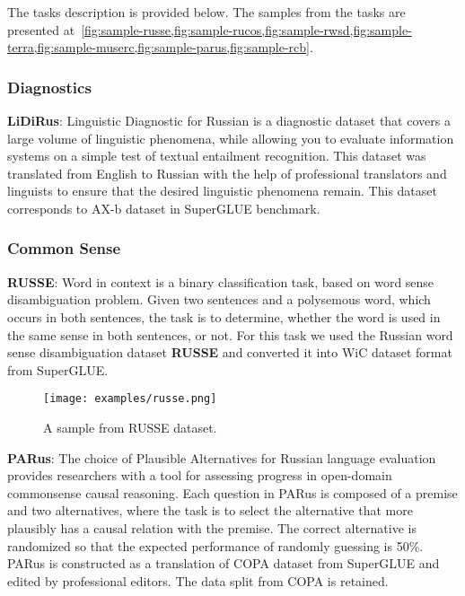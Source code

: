 \documentclass[11pt,a4paper]{article}
\begin{document}
The tasks description is provided below. The samples from the tasks are presented at~\cref{fig:sample-russe,fig:sample-rucos,fig:sample-rwsd,fig:sample-terra,fig:sample-muserc,fig:sample-parus,fig:sample-rcb}.



\subsubsection{Diagnostics}  \label{sec:diagnostics}


\textbf{LiDiRus}: Linguistic Diagnostic for Russian is a diagnostic dataset that covers a large volume of linguistic phenomena, while allowing you to evaluate information systems on a simple test of textual entailment recognition. This dataset was translated from English to Russian with the help of professional translators and linguists to ensure that the desired linguistic phenomena remain. This dataset corresponds to AX-b dataset in SuperGLUE benchmark. 

\subsubsection{Common Sense}

\textbf{RUSSE}: Word in context is a binary classification task, based on word sense disambiguation problem. Given two sentences and a polysemous word, which occurs in both sentences, the task is to determine, whether the word is used in the same sense in both sentences, or not. For this task we used the Russian word sense disambiguation dataset \textbf{RUSSE}  \cite{panchenko2015russe} and converted it into WiC dataset format from SuperGLUE.  

\begin{figure}[!h]
    \centering
\texttt{[image: examples/russe.png]}
\caption{A sample from RUSSE dataset.}
\label{fig:sample-russe}
\end{figure}

\textbf{PARus}: The choice of Plausible Alternatives for Russian language evaluation provides researchers with a tool for assessing progress in open-domain commonsense causal reasoning. Each question in PARus is composed of a premise and two alternatives, where the task is to select the alternative that more plausibly has a causal relation with the premise. The correct alternative is randomized so that the expected performance of randomly guessing is 50\%.
PARus is constructed as a translation of COPA dataset from SuperGLUE and edited by professional editors. The data split from COPA is retained.
\end{document}
